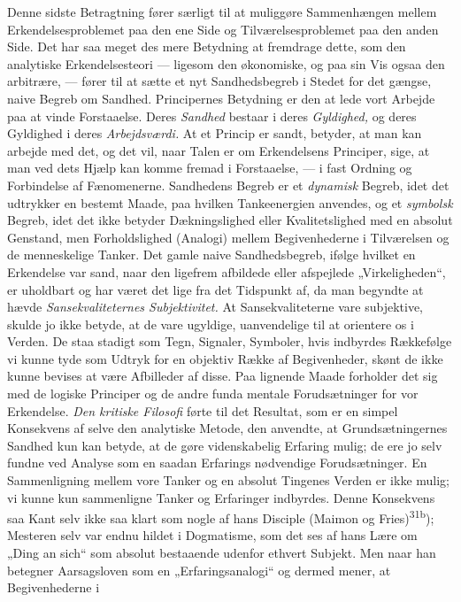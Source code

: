 \documentclass[12pt,a4paper,openany]{book}
\newcommand{\opage}[1]{\marginnote{\footnotesize\textit{[#1]}}}
\begin{document}
Denne sidste Betragtning fører særligt til at muliggøre Sammenhængen mellem
Erkendelsesproblemet paa den ene Side og Tilværelsesproblemet paa den anden
Side. Det har saa meget des mere Betydning at fremdrage dette, som den
analytiske Erkendelsesteori --- ligesom den økonomiske, og paa sin Vis ogsaa
den arbitrære, --- fører til at sætte et nyt Sandhedsbegreb i Stedet for det
gængse, naive Begreb om Sandhed. Principernes Betydning er den at lede vort
Arbejde paa at vinde Forstaaelse. Deres \textit{Sandhed} bestaar i deres
\textit{Gyldighed,} og deres Gyldighed i deres \textit{Arbejdsværdi.} At et
Princip er sandt, betyder, at man kan arbejde med det, og det vil, naar Talen
er om Erkendelsens Principer, sige, at man ved dets Hjælp kan komme fremad i
Forstaaelse, --- i fast Ordning og Forbindelse af Fænomenerne. Sandhedens
Begreb er et \textit{dynamisk} Begreb, idet det udtrykker en bestemt Maade, paa
hvilken Tankeenergien anvendes, og et \textit{symbolsk} Begreb, idet det ikke
betyder Dækningslighed eller Kvalitetslighed med en absolut Genstand, men
Forholdslighed (Analogi) mellem Begivenhederne i Tilværelsen og de menneskelige
Tanker. Det gamle naive Sandhedsbegreb, ifølge hvilket en Erkendelse var sand,
naar den ligefrem afbildede eller afspejlede „Virkeligheden“, er uholdbart og
har været det lige fra det Tidspunkt af, da man begyndte at hævde
\textit{Sansekvaliteternes Subjektivitet.} At Sansekvaliteterne vare
subjektive, skulde jo ikke betyde, at de vare ugyldige, uanvendelige til at
orientere os i Verden. De staa stadigt som Tegn, Signaler, Symboler, hvis
indbyrdes Rækkefølge vi kunne tyde som Udtryk for en objektiv Række af
Begivenheder, skønt de ikke kunne bevises at være Afbilleder af disse. Paa
lignende Maade forholder det sig med de logiske Principer og de andre funda%
\opage{38}mentale Forudsætninger for vor Erkendelse. \textit{Den kritiske
Filosofi} førte til det Resultat, som er en simpel Konsekvens af selve den
analytiske Metode, den anvendte, at Grundsætningernes Sandhed kun kan betyde,
at de gøre videnskabelig Erfaring mulig; de ere jo selv fundne ved Analyse som
en saadan Erfarings nødvendige Forudsætninger. En Sammenligning mellem vore
Tanker og en absolut Tingenes Verden er ikke mulig; vi kunne kun sammenligne
Tanker og Erfaringer indbyrdes. Denne Konsekvens saa Kant selv ikke saa klart
som nogle af hans Disciple (Maimon og Fries)\textsuperscript{31b}); Mesteren
selv var endnu hildet i Dogmatisme, som det ses af hans Lære om „Ding an sich“
som absolut bestaaende udenfor ethvert Subjekt. Men naar han betegner
Aarsagsloven som en „Erfaringsanalogi“ og dermed mener, at Begivenhederne i
\end{document}
